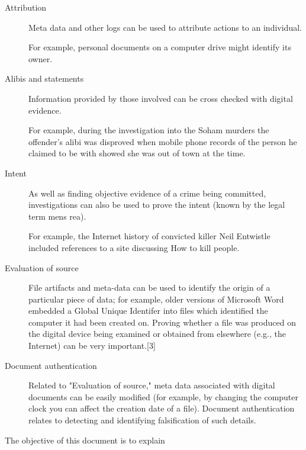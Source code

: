 \begin{description}
	\item [Attribution]
		Meta data and other logs can be used to attribute actions to an
		individual. 
		
		For example, personal documents on a computer drive might
		identify its owner.
	\item [Alibis and statements]
		Information provided by those involved can be cross checked
		with digital evidence.
		
		For example, during the investigation into the Soham murders
		the offender's alibi was disproved when mobile phone records of
		the person he 	claimed to be with showed she was out of town
		at the time.
	\item [Intent]
		As well as finding objective evidence of a crime being
		committed, investigations can also be used to prove the intent
		(known by the legal term mens rea).
		
		For example, the Internet history of convicted killer Neil
		Entwistle included references to a site discussing How to kill
		people.
	\item [Evaluation of source]
		File artifacts and meta-data can be used to identify the origin
		of a particular piece of data; for example, older versions of
		Microsoft Word embedded a Global Unique Identifer into files
		which identified the computer it had been created on.  Proving
		whether a file was produced on the digital device being
		examined or obtained from elsewhere (e.g., the Internet) can be
		very important.[3]
	\item [Document authentication]
		Related to "Evaluation of source," meta data associated with
		digital documents can be easily modified (for example, by
		changing the computer clock you can affect the creation date of
		a file). Document authentication relates to detecting and
		identifying falsification of such details.
\end{description}

The objective of this document is to explain 

